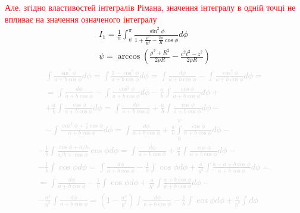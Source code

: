\textcolor{red} {Але, згідно властивостей інтегралів Рімана, значення інтегралу 
в одній точці не впливає на значення означеного інтегралу}
%
\begin{equation*} \begin{aligned}
I_1 = \frac{1}{\pi} \int_{\psi}^{\pi}
\frac{\sin^2{\phi}}{1 + \frac{\rho^2}{R^2} - 
\frac{2 \rho}{R} \cos \phi} d \phi \\
\psi = \arccos \left( \frac{\rho^2 + R^2}{2 \rho R} - 
\frac{c^2 t^2 - z^2}{2 \rho R} \right)
\end{aligned} \end{equation*}
%
\textcolor{lightgray}{ \begin{equation*} \begin{aligned}
\int \frac{\sin^2{\phi}}{a + b \cos \phi} d \phi = 
\int \frac{1 - \cos^2{\phi}}{a + b \cos \phi} d \phi = 
\int\frac{d \phi}{a + b \cos \phi}  -
\int \frac{\cos^2{\phi}}{a + b \cos \phi} d \phi = \\
= \int \frac{d \phi}{a + b \cos \phi}  - 
\int \frac{\cos^2{\phi}}{a + b \cos \phi} d \phi -
\frac{a}{b} \int \frac{\cos \phi}{a + b \cos \phi} d \phi + \\
+ \frac{a}{b} \int \frac{\cos \phi}{a + b \cos \phi} d \phi = 
\int \frac{d \phi}{a + b \cos \phi} +
\frac{a}{b} \int \frac{\cos \phi}{a + b \cos \phi} d \phi - \\
- \int \frac{\cos^2{\phi} + \frac{a}{b} \cos \phi} {a + b \cos \phi} d \phi =
\int \frac{d \phi}{a + b \cos \phi} + 
\frac{a}{b} \int\limits_{0}^{\psi} \frac{\cos \phi}{a + b \cos \phi} d \phi -
\end{aligned} \end{equation*} }
%
\textcolor{lightgray}{ \begin{equation*} \begin{aligned}
- \frac{1}{b} \int \frac{\cos \phi + a/b} {a/b +  \cos \phi} \cos \phi d \phi = 
\int \frac{d \phi}{a + b \cos \phi} + 
\frac{a}{b} \int \frac{\cos \phi}{a + b \cos \phi} d \phi - \\
- \frac{1}{b} \int \cos \phi d \phi = \int \frac{d \phi}{a + b \cos \phi} - 
\frac{1}{b} \int \cos \phi d \phi + \frac{a}{b^2} \int
\frac{a - a + b \cos \phi}{a + b \cos \phi} d \phi = \\ 
= \int\frac{d \phi}{a + b \cos \phi} - \frac{1}{b} \int \cos \phi d \phi +
\frac{a}{b^2} \int \frac{a + b \cos \phi}{a + b \cos \phi} d \phi - \\ 
- \frac{a^2}{b^2} \int \frac{d \phi}{a + b \cos \phi} = 
\left( 1 - \frac{a^2}{b^2} \right) \int\frac{d \phi}{a + b \cos \phi} - 
\frac{1}{b} \int \cos \phi d \phi + \frac{a}{b^2} \int d \phi
\end{aligned} \end{equation*} }

